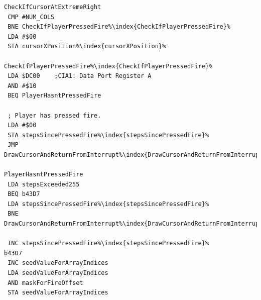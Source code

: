 \begin{minipage}[b]{0.33\linewidth}
\begin{lrbox}{\mybox}
\begin{lstlisting}[basicstyle=\ttfamily\tiny,escapechar=\%]
CheckIfCursorAtExtremeRight   
 CMP #NUM_COLS
 BNE CheckIfPlayerPressedFire%\index{CheckIfPlayerPressedFire}%
 LDA #$00
 STA cursorXPosition%\index{cursorXPosition}%

CheckIfPlayerPressedFire%\index{CheckIfPlayerPressedFire}%   
 LDA $DC00    ;CIA1: Data Port Register A
 AND #$10
 BEQ PlayerHasntPressedFire

 ; Player has pressed fire.
 LDA #$00
 STA stepsSincePressedFire%\index{stepsSincePressedFire}%
 JMP DrawCursorAndReturnFromInterrupt%\index{DrawCursorAndReturnFromInterrupt}%

PlayerHasntPressedFire   
 LDA stepsExceeded255
 BEQ b43D7
 LDA stepsSincePressedFire%\index{stepsSincePressedFire}%
 BNE DrawCursorAndReturnFromInterrupt%\index{DrawCursorAndReturnFromInterrupt}%

 INC stepsSincePressedFire%\index{stepsSincePressedFire}%
b43D7
 INC seedValueForArrayIndices
 LDA seedValueForArrayIndices
 AND maskForFireOffset
 STA seedValueForArrayIndices

\end{lstlisting}
\end{lrbox}%
\scalebox{0.8}{\usebox{\mybox}}
\end{minipage}
\hspace{-0.1cm}
